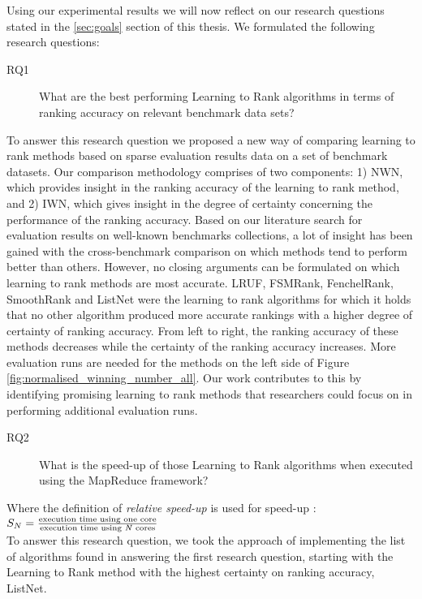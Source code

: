 Using our experimental results we will now reflect on our research questions stated in the \ref{sec:goals} section of this thesis. We formulated the following research questions:
\begin{description}
\item[RQ1] What are the best performing Learning to Rank algorithms in terms of ranking accuracy on relevant benchmark data sets?
\end{description}
To answer this research question we proposed a new way of comparing learning to rank methods based on sparse evaluation results data on a set of benchmark datasets. Our comparison methodology comprises of two components: 1) \ac{NWN}, which provides insight in the ranking accuracy of the learning to rank method, and 2) \ac{IWN}, which gives insight in the degree of certainty concerning the performance of the ranking accuracy. Based on our literature search for evaluation results on well-known benchmarks collections, a lot of insight has been gained with the cross-benchmark comparison on which methods tend to perform better than others. However, no closing arguments can be formulated on which learning to rank methods are most accurate. LRUF, FSMRank, FenchelRank, SmoothRank and ListNet were the learning to rank algorithms for which it holds that no other algorithm produced more accurate rankings with a higher degree of certainty of ranking accuracy. From left to right, the ranking accuracy of these methods decreases while the certainty of the ranking accuracy increases. More evaluation runs are needed for the methods on the left side of Figure \ref{fig:normalised_winning_number_all}. Our work contributes to this by identifying promising learning to rank methods that researchers could focus on in performing additional evaluation runs.

\begin{description}
\item[RQ2] What is the speed-up of those Learning to Rank algorithms when executed using the MapReduce framework?
\end{description}
\bigskip
Where the definition of \emph{relative speed-up} is used for speed-up \cite{Sun1991}:\\

$S_N = \frac{\text{execution time using one core}}{\text{execution time using \emph{N} cores}}$\\

To answer this research question, we took the approach of implementing the list of algorithms found in answering the first research question, starting with the Learning to Rank method with the highest certainty on ranking accuracy, ListNet.\\

